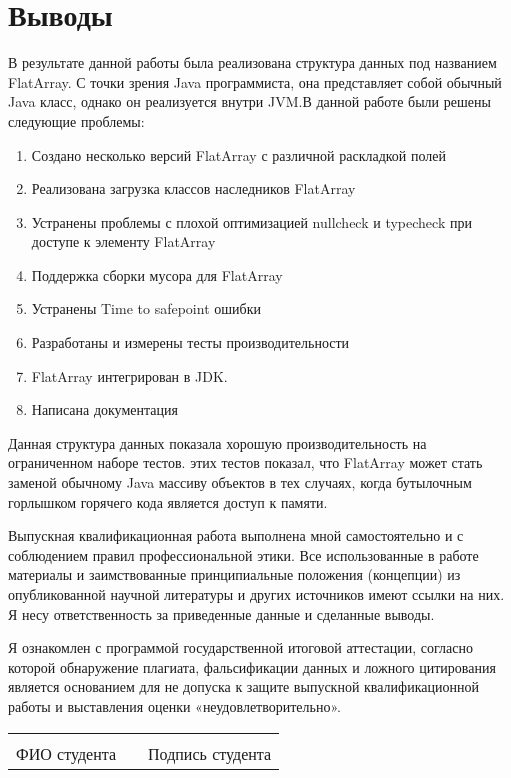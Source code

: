 \section{Выводы}
В результате данной работы была реализована структура данных под названием FlatArray. С точки зрения Java программиста,
она представляет собой обычный Java класс, однако он реализуется внутри JVM.В данной работе были решены следующие проблемы:
\begin{enumerate}
	\item Создано несколько версий FlatArray с различной раскладкой полей
	\item Реализована загрузка классов наследников FlatArray
	\item Устранены проблемы с плохой оптимизацией nullcheck и typecheck при доступе к элементу FlatArray
	\item Поддержка сборки мусора для FlatArray
	\item Устранены Time to safepoint ошибки
	\item Разработаны и измерены тесты производительности 
	\item FlatArray интегрирован в JDK.
	\item Написана документация
\end{enumerate}
\par
Данная структура данных показала хорошую производительность на ограниченном наборе тестов. этих тестов показал, что FlatArray может стать заменой обычному Java массиву объектов в тех случаях, когда бутылочным горлышком горячего кода является доступ к памяти.
\par
Выпускная квалификационная работа выполнена мной самостоятельно и с соблюдением правил профессиональной этики. Все использованные в работе материалы и заимствованные принципиальные положения (концепции) из опубликованной научной литературы и других источников имеют ссылки на них. Я несу ответственность за приведенные данные и сделанные выводы.
\par
Я ознакомлен с программой государственной итоговой аттестации, согласно которой обнаружение плагиата, фальсификации данных и ложного цитирования является основанием для не допуска к защите выпускной квалификационной работы и выставления оценки «неудовлетворительно».

\begin{tabular}{lp{2em}l} 
	\hspace{5cm}   && \hspace{4cm} \\ \cline{1-1}\cline{3-3} 
	ФИО студента   && Подпись студента
\end{tabular}

\clearpage
